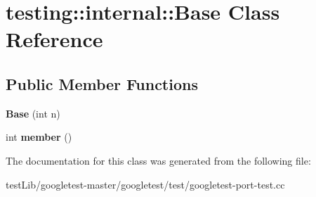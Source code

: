 \hypertarget{classtesting_1_1internal_1_1Base}{}\section{testing\+:\+:internal\+:\+:Base Class Reference}
\label{classtesting_1_1internal_1_1Base}
\subsection*{Public Member Functions}
\begin{DoxyCompactItemize}
\item 
\mbox{\label{classtesting_1_1internal_1_1Base_a255d105410a1eeb5f4690c9c8cd8e104}} 
{\bfseries Base} (int n)
\item 
\mbox{\label{classtesting_1_1internal_1_1Base_a7ddba6221b56613be545544b7ef6214c}} 
int {\bfseries member} ()
\end{DoxyCompactItemize}


The documentation for this class was generated from the following file\+:\begin{DoxyCompactItemize}
\item 
test\+Lib/googletest-\/master/googletest/test/googletest-\/port-\/test.\+cc\end{DoxyCompactItemize}
